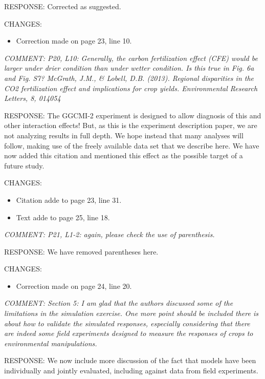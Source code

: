 \documentclass[gmd, manuscript]{copernicus} %
\begin{document}
RESPONSE: Corrected as suggested.
\smallskip

CHANGES:
\begin{itemize}
    \item Correction made on page 23, line 10.
\end{itemize}

\smallskip

\textcolor{dark-gray}{\textit{COMMENT: P20, L10: Generally, the carbon fertilization effect (CFE) would be larger under drier condition than under wetter condition. Is this true in Fig. 6a and Fig. S7? McGrath, J.M., \& Lobell, D.B. (2013). Regional disparities in the CO2 fertilization effect and implications for crop yields. Environmental Research Letters, 8, 014054}}

RESPONSE: The GGCMI-2 experiment is designed to allow diagnosis of this and other interaction effects! But, as this is the experiment description paper, we are not analyzing results in full depth. We hope instead that many analyses will follow, making use of the freely available data set that we describe here. We have now added this citation and mentioned this effect as the possible target of a future study.
\smallskip

CHANGES:
\begin{itemize}
    \item Citation adde to page 23, line 31.
    \item Text adde to page 25, line 18.
\end{itemize}

\smallskip

\textcolor{dark-gray}{\textit{COMMENT: P21, L1-2: again, please check the use of parenthesis.}}

RESPONSE: We have removed parentheses here.
\smallskip

CHANGES:
\begin{itemize}
    \item Correction made on page 24, line 20.
\end{itemize}

\smallskip

\textcolor{dark-gray}{\textit{COMMENT: Section 5: I am glad that the authors discussed some of the limitations in the simulation exercise. One more point should be included there is about how to validate the simulated responses, especially considering that there are indeed some field experiments designed to measure the responses of crops to environmental manipulations.}}

RESPONSE: We now include more discussion of the fact that models have been individually and jointly evaluated, including against data from field experiments. 
\end{document}
